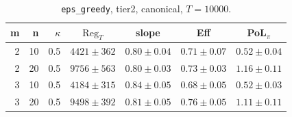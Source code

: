 \begin{table}[htbp]
\centering
\scriptsize
\caption{\texttt{eps\_greedy}, tier2, canonical, $T=10000$.}
\label{tab:tier2_long_eps_greedy}
\begin{tabular}{@{}rrrcccc@{}}
\toprule
m & n & $\kappa$ & $\mathrm{Reg}_T$ & slope & Eff & PoL$_\pi$ \\
\midrule
2 & 10 & 0.5 & $4421 \pm 362$ & $0.80 \pm 0.04$ & $0.71 \pm 0.07$ & $0.52 \pm 0.04$ \\
2 & 20 & 0.5 & $9756 \pm 563$ & $0.80 \pm 0.03$ & $0.73 \pm 0.03$ & $1.16 \pm 0.11$ \\
\midrule
3 & 10 & 0.5 & $4184 \pm 315$ & $0.84 \pm 0.05$ & $0.68 \pm 0.05$ & $0.52 \pm 0.03$ \\
3 & 20 & 0.5 & $9498 \pm 392$ & $0.81 \pm 0.05$ & $0.76 \pm 0.05$ & $1.11 \pm 0.11$ \\
\bottomrule
\end{tabular}
\end{table}
